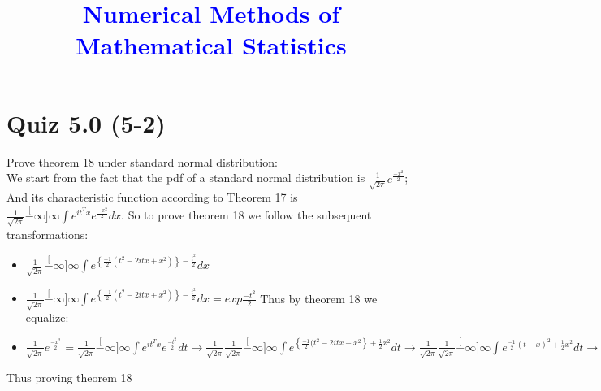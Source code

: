 \documentclass[english]{article}
\begin{document}
\title{\textcolor{blue}{\large{}Numerical Methods of Mathematical Statistics }}

\maketitle

\section{Quiz 5.0 (5-2)}

Prove theorem 18 under standard normal distribution:\\
We start from the fact that the pdf of a standard normal distribution
is $\frac{1}{\sqrt{2\pi}}e^{\frac{-x^{2}}{2}}$; And its characteristic
function according to Theorem 17 is $\frac{1}{\sqrt{2\pi}}\stackrel[-\infty]{\infty}{\int}e^{it^{T}x}e^{\frac{-x^{2}}{2}}dx$.
So to prove theorem 18 we follow the subsequent transformations:
\begin{itemize}
\item $\frac{1}{\sqrt{2\pi}}\stackrel[-\infty]{\infty}{\int}e^{\left\{ \frac{-1}{2}\left(t^{2}-2itx+x^{2}\right)\right\} -\frac{t^{2}}{2}}dx$ 
\item $\frac{1}{\sqrt{2\pi}}\stackrel[-\infty]{\infty}{\int}e^{\left\{ \frac{-1}{2}\left(t^{2}-2itx+x^{2}\right)\right\} -\frac{t^{2}}{2}}dx=exp\frac{-t^{2}}{2}$
Thus by theorem 18 we equalize:
\item $\frac{1}{\sqrt{2\pi}}e^{\frac{-x^{2}}{2}}=\frac{1}{\sqrt{2\pi}}\stackrel[-\infty]{\infty}{\int}e^{it^{T}x}e^{\frac{-t^{2}}{2}}dt\longrightarrow\frac{1}{\sqrt{2\pi}}\frac{1}{\sqrt{2\pi}}\stackrel[-\infty]{\infty}{\int}e^{\left\{ \frac{-1}{2}(t^{2}-2itx-x^{2}\right\} +\frac{1}{2}x^{2}}dt\longrightarrow\frac{1}{\sqrt{2\pi}}\frac{1}{\sqrt{2\pi}}\stackrel[-\infty]{\infty}{\int}e^{\frac{-1}{2}(t-x)^{2}+\frac{1}{2}x^{2}}dt\longrightarrow\frac{1}{\sqrt{2\pi}}e^{\frac{-x^{2}}{2}}$
\end{itemize}
Thus proving theorem 18
\end{document}
